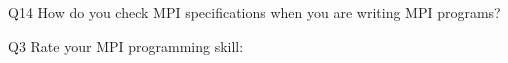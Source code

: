 \begin{description}%
\item{Q14} How do you check MPI specifications when you are writing MPI programs?%
\item{Q3} Rate your MPI programming skill:%
\end{description}%
